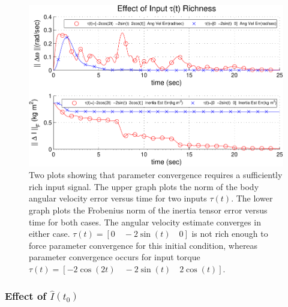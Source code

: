  \begin{center}
 \begin{figure}[htbp]
   \begin{center}
     \includegraphics[width=150mm]{./chSMS_ID/images/perExcit01}
   \end{center}
   \caption{ Two plots showing that parameter convergence requires a
     sufficiently rich input signal.  The upper graph plots the norm
     of the body angular velocity error versus time for two inputs
     $\tau(t)$.  The lower graph plots the Frobenius norm of the inertia
     tensor error versus time for both cases.  The angular velocity
     estimate converges in either case. $\tau(t)=[0\quad -2\sin(t)\quad 0]$ is not
     rich enough to force parameter convergence for this initial
     condition, whereas parameter convergence occurs for input torque
     $\tau(t)=[-2\cos(2t)\quad -2\sin(t)\quad 2\cos(t)]$.  }
   \label{chSMS_ID.fig.SO3_AID_perExcit}
 \end{figure}
 \end{center}

\subsubsection{Effect of $\hat{I}(t_0)$}


